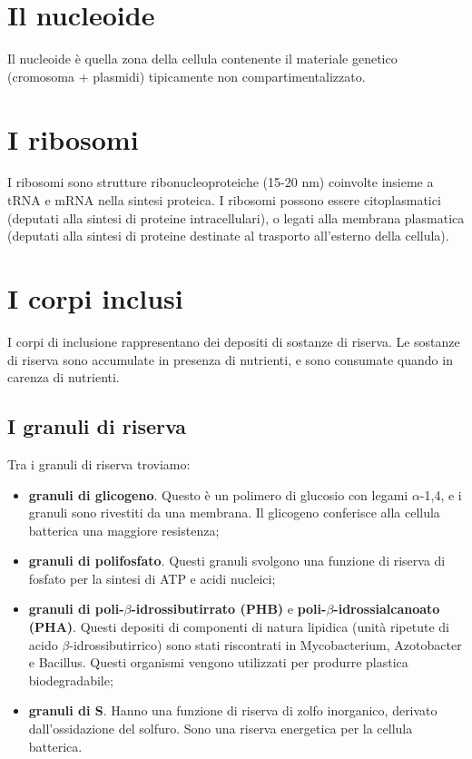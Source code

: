 \documentclass[11pt]{book}
\begin{document}
\section{Il nucleoide}
Il nucleoide è quella zona della cellula contenente il materiale genetico (cromosoma + plasmidi) tipicamente non compartimentalizzato. 

\section{I ribosomi}
I ribosomi sono strutture ribonucleoproteiche (15-20 nm) coinvolte insieme a tRNA e mRNA nella sintesi proteica. I ribosomi possono essere citoplasmatici (deputati alla sintesi di proteine intracellulari), o legati alla membrana plasmatica (deputati alla sintesi di proteine destinate al trasporto all’esterno della cellula).

\section{I corpi inclusi}
I corpi di inclusione rappresentano dei depositi di sostanze di riserva. Le sostanze di riserva sono accumulate in presenza di nutrienti, e sono consumate quando in carenza di nutrienti.

\subsection{I granuli di riserva}
Tra i granuli di riserva troviamo:
\begin{itemize}
\item \textbf{granuli di glicogeno}. Questo è un polimero di glucosio con legami $\alpha$-1,4, e i granuli sono rivestiti da una membrana.
Il glicogeno conferisce alla cellula batterica una maggiore resistenza;
\item \textbf{granuli di polifosfato}. Questi granuli svolgono una funzione di riserva di fosfato per la sintesi di ATP e acidi nucleici;
\item \textbf{granuli di poli-$\beta$-idrossibutirrato (PHB)} e \textbf{poli-$\beta$-idrossialcanoato (PHA)}. Questi depositi di componenti di natura lipidica (unità ripetute di acido $\beta$-idrossibutirrico) sono stati riscontrati in Mycobacterium, Azotobacter e Bacillus. Questi organismi vengono utilizzati per produrre plastica biodegradabile;
\item \textbf{granuli di S}. Hanno una funzione di riserva di zolfo inorganico, derivato dall’ossidazione del solfuro. Sono una riserva energetica per la cellula batterica.
\end{itemize}
\end{document}
